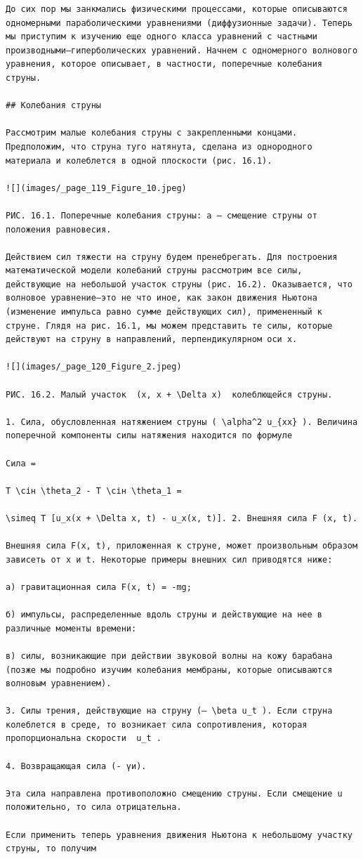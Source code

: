 \documentclass[
  ukrainian,
]{article}
\begin{document}
\begin{verbatim}
До сих пор мы занкмались физическими процессами, которые описываются одномерными параболическими уравнениями (диффузионные задачи). Теперь мы приступим к изучению еще одного класса уравнений с частными производными—гиперболических уравнений. Начнем с одномерного волнового уравнения, которое описывает, в частности, поперечные колебания струны.

## Колебания струны

Рассмотрим малые колебания струны с закрепленными концами. Предположим, что струна туго натянута, сделана из однородного материала и колеблется в одной плоскости (рис. 16.1).

![](images/_page_119_Figure_10.jpeg)

РИС. 16.1. Поперечные колебания струны: a — смещение струны от положения равновесия.

Действием сил тяжести на струну будем пренебрегать. Для построения математической модели колебаний струны рассмотрим все силы, действующие на небольшой участок струны (рис. 16.2). Оказывается, что волновое уравнение—это не что иное, как закон движения Ньютона (изменение импульса равно сумме действующих сил), примененный к струне. Глядя на рис. 16.1, мы можем представить те силы, которые действуют на струну в направлений, перпендикулярном оси х.

![](images/_page_120_Figure_2.jpeg)

РИС. 16.2. Малый участок  (x, x + \Delta x)  колеблющейся струны.

1. Сила, обусловленная натяжением струны ( \alpha^2 u_{xx} ). Величина поперечной компоненты силы натяжения находится по формуле

Сила = 

Т \сін \theta_2 - Т \сін \theta_1 =

\simeq T [u_x(x + \Delta x, t) - u_x(x, t)]. 2. Внешняя сила F (x, t).

Внешняя сила F(x, t), приложенная к струне, может произвольным образом зависеть от x и t. Некоторые примеры внешних сил приводятся ниже:

а) гравитационная сила F(x, t) = -mg;

б) импульсы, распределенные вдоль струны и действующие на нее в различные моменты времени:

в) силы, возникающие при действии звуковой волны на кожу барабана (позже мы подробно изучим колебания мембраны, которые описываются волновым уравнением).

3. Силы трения, действующие на струну (— \beta u_t ). Если струна колеблется в среде, то возникает сила сопротивления, которая пропорциональна скорости  u_t .

4. Возвращающая сила (- үи).

Эта сила направлена противоположно смещению струны. Если смещение u положительно, то сила отрицательна.

Если применить теперь уравнения движения Ньютона к небольшому участку струны, то получим
\end{verbatim}
\end{document}
